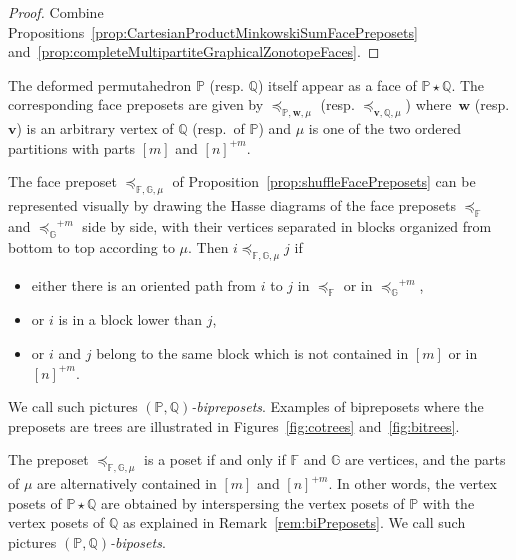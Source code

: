 \documentclass[AHL,Unicode,longabstracts,published]{cedram}
\renewcommand{\b}[1]{\boldsymbol{#1}}
\newcommand{\shuffleDP}{\star} %
\newcommand{\polytope}[1]{\mathds{#1}}
\begin{document}
\begin{proof}
Combine Propositions~\ref{prop:CartesianProductMinkowskiSumFacePreposets} and~\ref{prop:completeMultipartiteGraphicalZonotopeFaces}.
\end{proof}

\begin{rema}\label{rem:shuffleFaces}
The deformed permutahedron $\polytope{P}$ (resp. $\polytope{Q}$) itself appear as a face of $\polytope{P} \shuffleDP \polytope{Q}$. The corresponding face preposets are given by $\preccurlyeq_{\polytope{P}, \b{w}, \mu}$ (resp. $\preccurlyeq_{\b{v}, \polytope{Q}, \mu}$) where~$\b{w}$ (resp. $\b{v}$) is an arbitrary vertex of $\polytope{Q}$ (resp.~of $\polytope{P}$) and $\mu$ is one of the two ordered partitions with parts $[m]$ and $[n]^{+m}$.
\end{rema}

\begin{rema}\label{rem:biPreposets}
The face preposet $\preccurlyeq_{\polytope{F}, \polytope{G}, \mu}$ of Proposition~\ref{prop:shuffleFacePreposets} can be represented visually by drawing the Hasse diagrams of the face preposets $\preccurlyeq_\polytope{F}$ and ${\preccurlyeq_\polytope{G}}^{+m}$ side by side, with their vertices separated in blocks organized from bottom to top according to $\mu$. Then $i \preccurlyeq_{\polytope{F}, \polytope{G}, \mu} j$ if
\begin{itemize}
\item either there is an oriented path from $i$ to $j$ in $\preccurlyeq_\polytope{F}$ or in ${\preccurlyeq_\polytope{G}}^{+m}$,
\item or $i$ is in a block lower than $j$,
\item or $i$ and $j$ belong to the same block which is not contained in $[m]$ or in $[n]^{+m}$.
\end{itemize}
We call such pictures
\emph{$(\polytope{P}, \polytope{Q})$-bipreposets}. Examples of bipreposets where the preposets are trees are illustrated in Figures~\ref{fig:cotrees} and~\ref{fig:bitrees}.
\end{rema}

\begin{rema}\label{rem:biPosets}
The preposet $\preccurlyeq_{\polytope{F}, \polytope{G}, \mu}$ is a poset if and only if $\polytope{F}$ and $\polytope{G}$ are vertices, and the parts of $\mu$ are alternatively contained in $[m]$ and $[n]^{+m}$. In other words, the vertex posets of $\polytope{P} \shuffleDP \polytope{Q}$ are obtained by interspersing the vertex posets of $\polytope{P}$ with the vertex posets of $\polytope{Q}$ as explained in Remark~\ref{rem:biPreposets}. We call such pictures
\emph{$(\polytope{P}, \polytope{Q})$-biposets}.
\end{rema}
\end{document}
